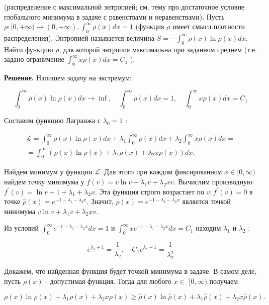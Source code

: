 \begin{task}
(распределение с максимальной энтропией; см. тему про достаточное условие глобального минимума в задаче с равенствами и неравенствами). 
Пусть $\rho:[0,+\infty) \rightarrow(0,+\infty), \int_{0}^{\infty} \rho(x) d x=1$ (функция $\rho$ имеет смысл плотности распределения). Энтропией называется величина $S=-\int_{0}^{\infty} \rho(x) \ln \rho(x) d x$. Найти функцию $\rho$, для которой энтропия максимальна при заданном среднем (т.е. задано ограничение $\int_{0}^{\infty} x \rho(x) d x=C_{1}$ ).

\textbf{Решение.} Напишем задачу на экстремум:

$$
\int_{0}^{\infty} \rho(x) \ln \rho(x) d x \rightarrow \inf , \quad \int_{0}^{\infty} \rho(x) d x=1, \quad \int_{0}^{\infty} x \rho(x) d x=C_{1}
$$

Составим функцию Лагранжа с $\lambda_{0}=1$ :

$$
\begin{gathered}
	\mathcal{L}=\int_{0}^{\infty} \rho(x) \ln \rho(x) d x+\lambda_{1} \int_{0}^{\infty} \rho(x) d x+\lambda_{2} \int_{0}^{\infty} x \rho(x) d x= \\
	=\int_{0}^{\infty}\left(\rho(x) \ln \rho(x)+\lambda_{1} \rho(x)+\lambda_{2} x \rho(x)\right) d x .
\end{gathered}
$$

Найдем минимум у функции $\mathcal{L}$. Для этого при каждом фиксированном $x \in[0, \infty)$ найдем точку минимума у $f(v)=v \ln v+\lambda_{1} v+\lambda_{2} x v$. Вычислим производную: $f^{\prime}(v)=\ln v+1+\lambda_{1}+\lambda_{2} x$. Эта функция строго возрастает по $v ; f^{\prime}(v)=0$ в точке $\hat{\rho}(x)=e^{-1-\lambda_{1}-\lambda_{2} x}$. Значит, $\hat{\rho}(x)=e^{-1-\lambda_{1}-\lambda_{2} x}$ является точкой минимума $v \ln v+\lambda_{1} v+\lambda_{2} x v$.

Из условий $\int_{0}^{\infty} e^{-1-\lambda_{1}-\lambda_{2} x} d x=1$ и $\int_{0}^{\infty} x e^{-1-\lambda_{1}-\lambda_{2} x} d x=C_{1}$ находим $\lambda_{1}$ и $\lambda_{2}$ :

$$
e^{\lambda_{1}+1}=\frac{1}{\lambda_{2}}, \quad C_{1} e^{\lambda_{1}+1}=\frac{1}{\lambda_{2}^{2}}
$$

Докажем, что найденная функция будет точкой минимума в задаче. В самом деле, пусть $\rho(x)$ - допустимая функция. Тогда для любого $x \in$ $[0, \infty)$ получаем

$$
\rho(x) \ln \rho(x)+\lambda_{1} \rho(x)+\lambda_{2} x \rho(x) \geq \hat{\rho}(x) \ln \hat{\rho}(x)+\lambda_{1} \hat{\rho}(x)+\lambda_{2} x \hat{\rho}(x) .
$$


\end{task}
